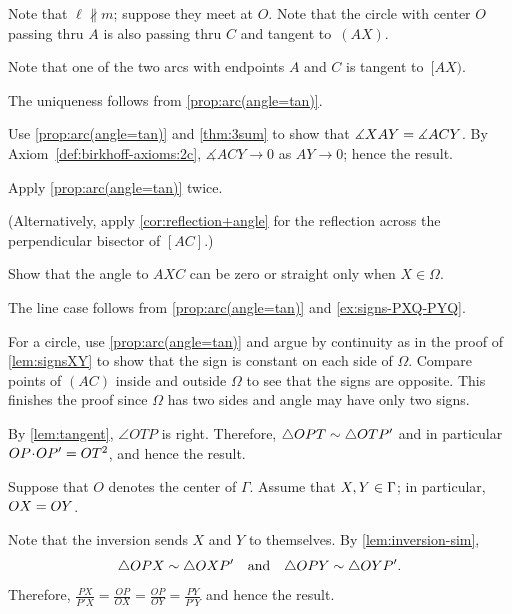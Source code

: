 Note that $\ell\nparallel m$;
suppose they meet at $O$.
Note that the circle with center $O$ passing thru $A$ is also passing thru $C$ and tangent to~$(AX)$.


Note that one of the two arcs with endpoints $A$ and $C$ is tangent to~$[AX)$.

The uniqueness follows from \ref{prop:arc(angle=tan)}.

 Use \ref{prop:arc(angle=tan)} and \ref{thm:3sum} to show that 
$\measuredangle XAY\z=\measuredangle ACY$.
By Axiom~\ref{def:birkhoff-axioms:2c}, $\measuredangle ACY\to 0$ as $AY\to 0$;
hence the result.

Apply \ref{prop:arc(angle=tan)} twice.

(Alternatively, apply \ref{cor:reflection+angle} for the reflection across the perpendicular bisector of $[AC]$.)

Show that the angle to $AXC$ can be zero or straight only when $X\in\Omega$.

The line case follows from \ref{prop:arc(angle=tan)} and \ref{ex:signs-PXQ-PYQ}.

For a circle, use \ref{prop:arc(angle=tan)} and argue by continuity as in the proof of \ref{lem:signsXY} to show that the sign is constant on each side of $\Omega$.
Compare points of $(AC)$ inside and outside $\Omega$ to see that the signs are opposite.
This finishes the proof since $\Omega$ has two sides and angle may have only two signs.






\setcounter{eqtn}{0}

By \ref{lem:tangent}, $\angle OTP$ is right.
Therefore, $\triangle OPT\z\sim \triangle OTP'$
and in particular
$OP\cdot OP'\z=OT^2$,
and hence the result.

Suppose that $O$ denotes the center of $\Gamma$.
Assume that $X,Y\z\in \Gamma$;
in particular, $OX\z=OY$.



Note that the inversion sends $X$ and $Y$ to themselves.
By \ref{lem:inversion-sim},
$$\triangle OPX\z\sim \triangle OXP'
\quad
\text{and}
\quad
\triangle OPY\sim \triangle OYP'.$$
Therefore, 
$\frac{PX}{P'X}=\frac{OP}{OX}=\frac{OP}{OY}=\frac{PY}{P'Y}$
and hence the result.

